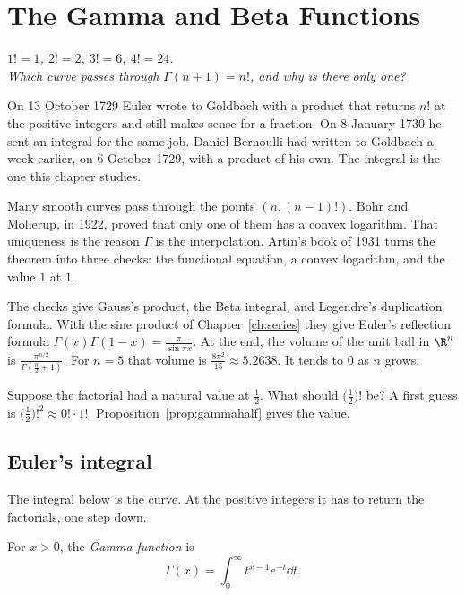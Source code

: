 \chapter{The Gamma and Beta Functions}\label{ch:gamma}

\begin{center}\itshape
$1!=1$, $2!=2$, $3!=6$, $4!=24$.\\
Which curve passes through $\Gamma(n+1)=n!$, and why is there only one?
\end{center}

On 13 October 1729 Euler wrote to Goldbach with a product that returns $n!$ at the positive integers and still makes sense for a fraction. On 8 January 1730 he sent an integral for the same job. Daniel Bernoulli had written to Goldbach a week earlier, on 6 October 1729, with a product of his own. The integral is the one this chapter studies.

Many smooth curves pass through the points $(n,(n-1)!)$. Bohr and Mollerup, in 1922, proved that only one of them has a convex logarithm. That uniqueness is the reason $\Gamma$ is the interpolation. Artin's book of 1931 turns the theorem into three checks: the functional equation, a convex logarithm, and the value $1$ at $1$.

The checks give Gauss's product, the Beta integral, and Legendre's duplication formula. With the sine product of Chapter~\ref{ch:series} they give Euler's reflection formula $\Gamma(x)\Gamma(1-x)=\frac\pi{\sin\pi x}$. At the end, the volume of the unit ball in $\R^n$ is $\frac{\pi^{n/2}}{\Gamma(\frac n2+1)}$. For $n=5$ that volume is $\frac{8\pi^2}{15}\approx5.2638$. It tends to $0$ as $n$ grows.

\begin{think}
Suppose the factorial had a natural value at $\frac12$. What should $\bigl(\frac12\bigr)!$ be? A first guess is $\bigl(\frac12\bigr)!^2\approx0!\cdot1!$. Proposition~\ref{prop:gammahalf} gives the value.
\end{think}

\section{Euler's integral}

The integral below is the curve. At the positive integers it has to return the factorials, one step down.

\begin{definition}
For $x>0$, the \emph{Gamma function} is
\[
\Gamma(x)=\int_0^\infty t^{x-1}e^{-t}\dd t.
\]
\end{definition}

